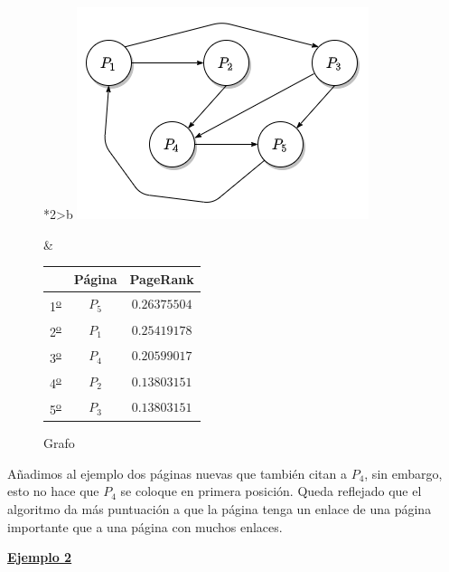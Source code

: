 \documentclass[size=a4, parskip=half, titlepage=false, toc=flat, toc=bib, 12pt]{scrartcl}
\theoremstyle{theorem-style}
\theoremstyle{definition-style}
\theoremstyle{remark-style}
\theoremstyle{example-style}
\theoremstyle{definition-style}
\theoremstyle{remark-style}
\begin{document}
\begin{figure}[!ht]
  \begin{tabular}{*{2}{>{\centering\arraybackslash}b{}}}
  \centering
    \includegraphics[scale=0.5]{./img/grafoej1}
    \caption{Grafo}
    &
      \renewcommand{\arraystretch}{1.3}
      \begin{tabular}{ccc}
         & Página & PageRank     \\ \hline
      1\textsuperscript{\underline{o}}} & $P_5$  & $0.26375504$ \\ \hline
      2\textsuperscript{\underline{o}}} & $P_1$  & $0.25419178$ \\ \hline
      3\textsuperscript{\underline{o}}} & $P_4$  & $0.20599017$ \\ \hline
      4\textsuperscript{\underline{o}}} & $P_2$  & $0.13803151$ \\ \hline
      5\textsuperscript{\underline{o}}} & $P_3$  & $0.13803151$ \\ \hline
      \end{tabular}
  \end{tabular}
\end{figure}

Añadimos al ejemplo dos páginas nuevas que también citan a $P_4$, sin embargo, esto no hace que $P_4$ se coloque en primera posición. Queda reflejado que el algoritmo da más puntuación a que la página tenga un enlace de una página importante que a una página con muchos enlaces.

\underline{\textbf{Ejemplo 2}}
\end{document}
